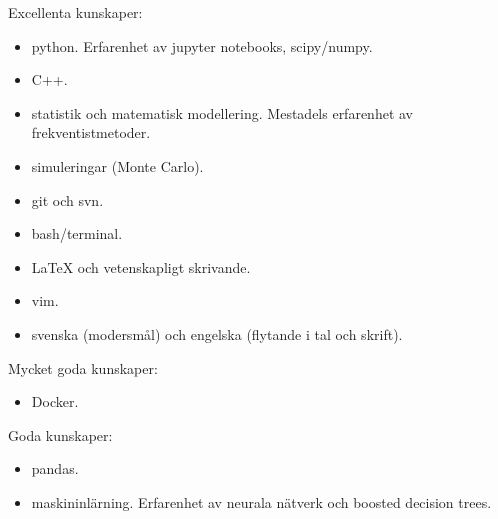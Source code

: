 



\begin{cvskills}



\cvskill
{Excellenta kunskaper:}
{\begin{itemize} \item python. Erfarenhet av jupyter notebooks, scipy/numpy.
						 \item C++.
						 \item statistik och matematisk modellering. Mestadels erfarenhet av frekventistmetoder.
						 \item simuleringar (Monte Carlo).
						 \item git och svn.
						 \item bash/terminal.
						 \item LaTeX och vetenskapligt skrivande.
						 \item vim.
						 \item svenska (modersmål) och engelska (flytande i tal och skrift).
						  \end{itemize}} %

\cvskill
{Mycket goda kunskaper:}
{\begin{itemize} \item Docker.
						\end{itemize}} %

\cvskill
{Goda kunskaper:}
{\begin{itemize} \item pandas.
						\item maskininlärning. Erfarenhet av neurala nätverk och boosted decision trees.
						\end{itemize}}





\end{cvskills}